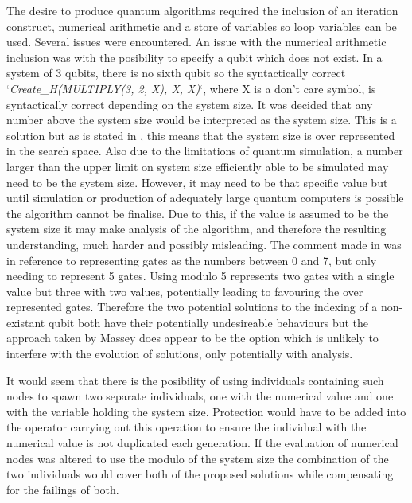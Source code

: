 The desire to produce quantum algorithms required the inclusion of an iteration construct, numerical arithmetic and a store of variables so loop variables can be used.
Several issues were encountered.
An issue with the numerical arithmetic inclusion was with the posibility to specify a qubit which does not exist.
In a system of 3 qubits, there is no sixth qubit so the syntactically correct `\emph{Create\_H(MULTIPLY(3, 2, X), X, X)}`\cite{masseythesis}, where X is a don't care symbol, is syntactically correct depending on the system size.
It was decided that any number above the system size would be interpreted as the system size.
This is a solution but as is stated in \cite{Stepney07searchingfor}, this means that the system size is over represented in the search space.
Also due to the limitations of quantum simulation, a number larger than the upper limit on system size efficiently able to be simulated may need to be the system size.
However, it may need to be that specific value but until simulation or production of adequately large quantum computers is possible the algorithm cannot be finalise.
Due to this, if the value is assumed to be the system size it may make analysis of the algorithm, and therefore the resulting understanding, much harder and possibly misleading.
The comment made in \cite{Stepney07searchingfor} was in reference to representing gates as the numbers between 0 and 7, but only needing to represent 5 gates.
Using modulo 5 represents two gates with a single value but three with two values, potentially leading to favouring the over represented gates.
Therefore the two potential solutions to the indexing of a non-existant qubit both have their potentially undesireable behaviours but the approach taken by Massey does appear to be the option which is unlikely to interfere with the evolution of solutions, only potentially with analysis.

It would seem that there is the posibility of using individuals containing such nodes to spawn two separate individuals, one with the numerical value and one with the variable holding the system size.
Protection would have to be added into the operator carrying out this operation to ensure the individual with the numerical value is not duplicated each generation. 
If the evaluation of numerical nodes was altered to use the modulo of the system size the combination of the two individuals would cover both of the proposed solutions while compensating for the failings of both.


